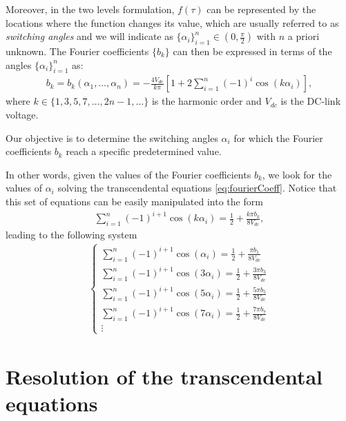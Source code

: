 \documentclass[a4paper]{article}
\numberwithin{equation}{section}
\begin{document}
Moreover, in the two levels formulation, $f(\tau)$ can be represented by the locations where the function changes its value, which are usually referred to as  \textit{switching angles} and we will indicate as $\{\alpha_i\}_{i=1}^n\in (0,\frac \pi2)$ with $n$ a priori unknown. The Fourier coefficients $\{b_k\}$ can then be expressed in terms of the angles $\{\alpha_i\}_{i=1}^n$ as:
\begin{align}\label{eq:fourierCoeff}
	b_k=b_k(\alpha_1,\ldots,\alpha_n) = -\frac{4V_{dc}}{k\pi}\left[1+2\sum_{i=1}^n(-1)^i\cos(k\alpha_i)\right], 
\end{align}
where $k\in\{1,3,5,7,\ldots,2n-1,\ldots\}$ is the harmonic order and $V_{dc}$ is the DC-link voltage. 

Our objective is to determine the switching angles $\alpha_i$ for which the Fourier coefficients $b_k$ reach a specific predetermined value. 

In other words, given the values of the Fourier coefficients $b_k$, we look for the values of $\alpha_i$ solving the transcendental equations \eqref{eq:fourierCoeff}. Notice that this set of equations can be easily manipulated into the form
\begin{align*}
	\sum_{i=1}^n(-1)^{i+1}\cos(k\alpha_i) = \frac 12 +\frac{k\pi b_k}{8V_{dc}}, 
\end{align*}
leading to the following system
\begin{align}\label{eq:transcEqBk}
	\begin{cases}
		\displaystyle \sum_{i=1}^n(-1)^{i+1}\cos(\alpha_i) = \frac 12 +\frac{\pi b_1}{8V_{dc}}
		\\[12pt]
		\displaystyle \sum_{i=1}^n(-1)^{i+1}\cos(3\alpha_i) = \frac 12 +\frac{3\pi b_3}{8V_{dc}}
		\\[12pt]
		\displaystyle \sum_{i=1}^n(-1)^{i+1}\cos(5\alpha_i) = \frac 12 +\frac{5\pi b_5}{8V_{dc}}
		\\[12pt]
		\displaystyle \sum_{i=1}^n(-1)^{i+1}\cos(7\alpha_i) = \frac 12 +\frac{7\pi b_7}{8V_{dc}} 
		\\
		\vdots 
	\end{cases}	
\end{align}

\section{Resolution of the transcendental equations}
\end{document}
